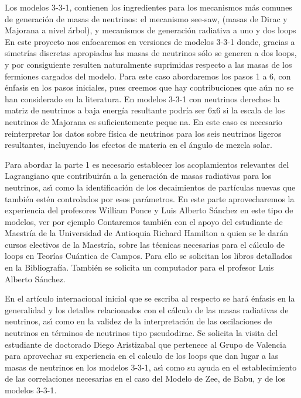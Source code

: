 Los modelos 3-3-1, contienen los ingredientes para los mecanismos más
comunes de generación de masas de neutrinos: el mecanismo see-saw,
(masas de Dirac y Majorana a nivel árbol), y mecanismos de generación
radiativa a uno y dos loops %
En este proyecto nos enfocaremos en
versiones de modelos 3-3-1 donde, gracias a simetrías discretas
apropiadas %
las masas de neutrinos sólo se generen a dos loops, y
por consiguiente resulten naturalmente suprimidas respecto a las masas
de los fermiones cargados del modelo. Para este caso abordaremos los
pasos 1 a 6, con énfasis en los pasos iniciales, pues creemos que hay
contribuciones que aún no se han considerado en la literatura. En
modelos 3-3-1 con neutrinos derechos la matriz de neutrinos a baja
energía resultante podría ser 6x6 si la escala de los neutrinos de
Majorana es suficientemente peque na. En este caso es necesario
reinterpretar los datos sobre física de neutrinos para los seis
neutrinos ligeros resultantes, incluyendo los efectos de materia en el
ángulo de mezcla solar.

Para abordar la parte 1 es necesario establecer los acoplamientos
relevantes del Lagrangiano que contribuirán a la generación de masas
radiativas para los neutrinos, as\'\i{} como la identificación de los
decaimientos de partículas nuevas que también estén controlados por
esos parámetros. En este parte aprovecharemos la experiencia del
profesores William Ponce y Luis Alberto Sánchez en este tipo de
modelos, ver por ejemplo %
 Contaremos también con
el apoyo del estudiante de Maestría de la Universidad de Antioquia
Richard Hamilton a quien se le darán cursos electivos de la Maestría,
sobre las técnicas necesarias para el cálculo de loops en Teorías
Cuántica de Campos. Para ello se solicitan los libros detallados en la
Bibliografía. También se solicita un computador para el profesor Luis
Alberto Sánchez.

En el artículo internacional inicial que se escriba al respecto se
hará énfasis en la generalidad y los detalles relacionados con el
cálculo de las masas radiativas de neutrinos, as\'\i{} como en la validez
de la interpretación de las oscilaciones de neutrinos en términos de
neutrinos tipo pseudodirac. Se solicita la visita del estudiante de
doctorado Diego Aristizabal que pertenece al Grupo de Valencia para
aprovechar su experiencia en el calculo de los loops que dan lugar a
las masas de neutrinos en los modelos 3-3-1, as\'\i{} como su ayuda en el
establecimiento de las correlaciones necesarias en el caso del Modelo
de Zee, de Babu, y de los modelos 3-3-1.

